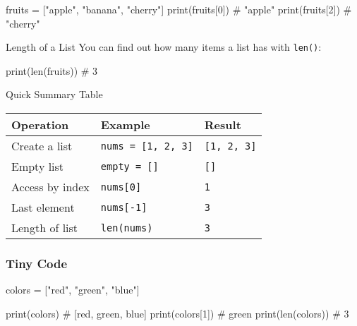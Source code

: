 \documentclass[
  letterpaper,
  DIV=11,
  numbers=noendperiod]{scrreprt}
\newenvironment{Shaded}{\begin{snugshade}}{\end{snugshade}}
\newcommand{\BuiltInTok}[1]{\textcolor[rgb]{0.00,0.23,0.31}{#1}}
\newcommand{\CommentTok}[1]{\textcolor[rgb]{0.37,0.37,0.37}{#1}}
\newcommand{\DecValTok}[1]{\textcolor[rgb]{0.68,0.00,0.00}{#1}}
\newcommand{\NormalTok}[1]{\textcolor[rgb]{0.00,0.23,0.31}{#1}}
\newcommand{\OperatorTok}[1]{\textcolor[rgb]{0.37,0.37,0.37}{#1}}
\newcommand{\StringTok}[1]{\textcolor[rgb]{0.13,0.47,0.30}{#1}}
\begin{document}
\begin{Shaded}
\begin{Highlighting}[]
\NormalTok{fruits }\OperatorTok{=}\NormalTok{ [}\StringTok{"apple"}\NormalTok{, }\StringTok{"banana"}\NormalTok{, }\StringTok{"cherry"}\NormalTok{]}
\BuiltInTok{print}\NormalTok{(fruits[}\DecValTok{0}\NormalTok{])   }\CommentTok{\# "apple"}
\BuiltInTok{print}\NormalTok{(fruits[}\DecValTok{2}\NormalTok{])   }\CommentTok{\# "cherry"}
\end{Highlighting}
\end{Shaded}

Length of a List You can find out how many items a list has with
\texttt{len()}:

\begin{Shaded}
\begin{Highlighting}[]
\BuiltInTok{print}\NormalTok{(}\BuiltInTok{len}\NormalTok{(fruits))  }\CommentTok{\# 3}
\end{Highlighting}
\end{Shaded}

Quick Summary Table

\begin{longtable}[]{@{}lll@{}}
\toprule\noalign{}
Operation & Example & Result \\
\midrule\noalign{}
\endhead
\bottomrule\noalign{}
\endlastfoot
Create a list & \texttt{nums\ =\ {[}1,\ 2,\ 3{]}} &
\texttt{{[}1,\ 2,\ 3{]}} \\
Empty list & \texttt{empty\ =\ {[}{]}} & \texttt{{[}{]}} \\
Access by index & \texttt{nums{[}0{]}} & \texttt{1} \\
Last element & \texttt{nums{[}-1{]}} & \texttt{3} \\
Length of list & \texttt{len(nums)} & \texttt{3} \\
\end{longtable}

\subsubsection{Tiny Code}\label{tiny-code-21}

\begin{Shaded}
\begin{Highlighting}[]
\NormalTok{colors }\OperatorTok{=}\NormalTok{ [}\StringTok{"red"}\NormalTok{, }\StringTok{"green"}\NormalTok{, }\StringTok{"blue"}\NormalTok{]}

\BuiltInTok{print}\NormalTok{(colors)        }\CommentTok{\# [\textquotesingle{}red\textquotesingle{}, \textquotesingle{}green\textquotesingle{}, \textquotesingle{}blue\textquotesingle{}]}
\BuiltInTok{print}\NormalTok{(colors[}\DecValTok{1}\NormalTok{])     }\CommentTok{\# \textquotesingle{}green\textquotesingle{}}
\BuiltInTok{print}\NormalTok{(}\BuiltInTok{len}\NormalTok{(colors))   }\CommentTok{\# 3}
\end{Highlighting}
\end{Shaded}
\end{document}
